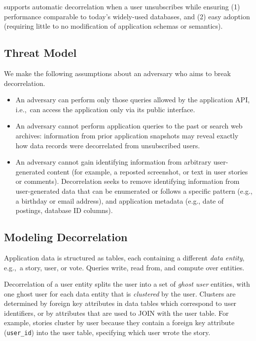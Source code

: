 \sys{} supports automatic decorrelation when a user unsubscribes while ensuring (1) performance
comparable to today’s widely-used databases, and (2) easy adoption (requiring little to no
modification of application schemas or semantics).

\subsection{Threat Model} 
We make the following assumptions about an adversary who aims to break decorrelation.
\begin{itemize}
    \item An adversary can perform only those queries allowed by the application API, 
i.e.,\ can access the application only via its public interface. 

    \item An adversary cannot perform application queries to the past or search web archives:
    information from prior application snapshots may reveal 
    exactly how data records were decorrelated from unsubscribed users. 

    \item An adversary cannot gain identifying information from arbitrary user-generated content (for
        example, a reposted screenshot, or text in user stories or comments). Decorrelation seeks to
        remove identifying information from user-generated data that can be enumerated or follows a
        specific pattern (e.g., a birthday or email address), and application metadata (e.g., date
        of postings, database ID columns).
\end{itemize}

\subsection{Modeling Decorrelation}
Application data is structured as tables, each containing a different \emph{data entity}, e.g.,\ a
story, user, or vote.  
Queries write, read
from, and compute over entities. 

Decorrelation of a user entity splits the user into a set of \emph{ghost user} entities, with one
ghost user for each data entity that is \emph{clustered} by the user.  Clusters are determined by
foreign key attributes in data tables which correspond to user identifiers, or by attributes that
are used to JOIN with the user table.  For example, stories cluster by user because they contain a
foreign key attribute (\texttt{user\_id}) into the user table, specifying which user wrote the
story.

